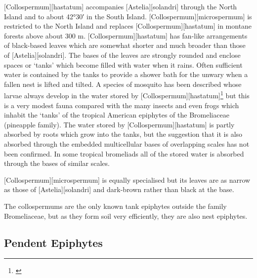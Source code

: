 [Collospermum][hastatum] accompanies [Astelia][solandri] through the North Island and to about \ang{42;30;} in the South Island. [Collospermum][microspermum] is restricted to the North Island and replaces [Collospermum][hastatum] in montane forests above about 300 m. [Collospermum][hastatum] has fan-like arrangements of black-based leaves which are somewhat shorter and much broader than those of [Astelia][solandri].
The bases of the leaves are strongly rounded and enclose spaces or `tanks' which become filled with water when it rains.
Often sufficient water is contained by the tanks to provide a shower bath for the unwary when a fallen  nest is lifted and tilted.
A species of mosquito has been described whose larvae always develop in the water stored by [Collospermum][hastatum]\footnote{\cite{belkin1968mosquito}} but this is a very modest fauna compared with the many insects and even frogs which inhabit the `tanks' of the tropical American epiphytes of the Bromeliaceae (pineapple family).
The water stored by [Collospermum][hastatum] is partly absorbed by roots which grow into the tanks, but the suggestion that it is also absorbed through the embedded multicellular bases of overlapping scales has not been confirmed.
In some tropical bromeliads all of the stored water is absorbed through the bases of similar scales.

[Collospermum][microspermum] is equally specialised but its leaves are as narrow as those of [Astelia][solandri] and dark-brown rather than black at the base.

The collospermums are the only known tank epiphytes outside the family Bromeliaceae, but as they form soil very efficiently, they are also nest epiphytes.

\subsection{Pendent Epiphytes}

